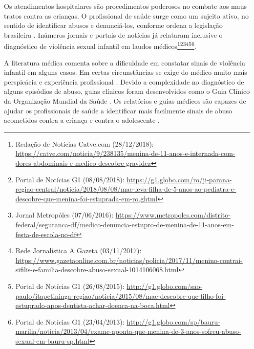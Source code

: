 Os atendimentos hospitalares são procedimentos poderosos no combate aos maus tratos contra as crianças. O profissional de saúde surge como um sujeito ativo, no sentido de identificar abusos e denunciá-los, conforme ordena a legislação brasileira \cite{costa2019maus}. Inúmeros jornais e portais de notícias já relataram inclusive o diagnóstico de violência sexual infantil em laudos médicos\footnote{Redação de Notícias Catve.com (28/12/2018): \url{https://catve.com/noticia/9/238135/menina-de-11-anos-e-internada-com-dores-abdominais-e-medico-descobre-gravidez}}\footnote{Portal de Notícias G1 (08/08/2018): \url{https://g1.globo.com/ro/ji-parana-regiao-central/noticia/2018/08/08/mae-leva-filha-de-5-anos-ao-pediatra-e-descobre-que-menina-foi-estuprada-em-ro.ghtml}}\footnote{Jornal Metropóles (07/06/2016): \url{https://www.metropoles.com/distrito-federal/seguranca-df/medico-denuncia-estupro-de-menina-de-11-anos-em-festa-de-escola-no-df}}\footnote{Rede Jornalística A Gazeta (03/11/2017): \url{https://www.gazetaonline.com.br/noticias/policia/2017/11/menino-contrai-sifilis-e-familia-descobre-abuso-sexual-1014106068.html}}\footnote{Portal de Notícias G1 (26/08/2015): \url{http://g1.globo.com/sao-paulo/itapetininga-regiao/noticia/2015/08/mae-descobre-que-filho-foi-estuprado-apos-dentista-achar-doenca-na-boca.html}}\footnote{Portal de Notícias G1 (23/04/2013): \url{http://g1.globo.com/sp/bauru-marilia/noticia/2013/04/exame-aponta-que-menina-de-3-anos-sofreu-abuso-sexual-em-bauru-sp.html}}.%



A literatura médica comenta sobre a dificuldade em constatar sinais de violência infantil em alguns casos. Em certas circunstâncias se exige do médico muito mais perspicácia e experiência profissional \cite{de2012violencia}. Devido a complexidade no diagnóstico de alguns episódios de abuso, guias clínicos foram desenvolvidos como o Guia Clínico da Organização Mundial da Saúde \cite{world2017responding}. Os relatórios e guias médicos são capazes de ajudar os profissionais de saúde a identificar mais facilmente sinais de abuso acometidos contra a criança e contra o adolescente \cite{Christian1}.

